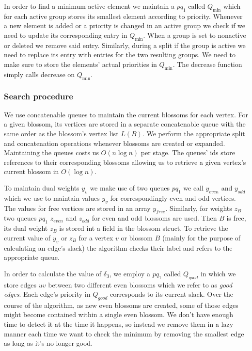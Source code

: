 In order to find a minimum active element we maintain a $pq_1$ called $Q_{\min}$ which for each active group stores its smallest element according to priority. Whenever a new element is added or a priority is changed in an active group we check if we need to update its corresponding entry in $Q_{\min}$. When a group is set to nonactive or deleted we remove said entry. Similarly, during a split if the group is active we need to replace its entry with entries for the two resulting groups. We need to make sure to store the elements' actual priorities in $Q_{\min}$. The decrease function simply calls decrease on $Q_{\min}$.

\subsubsection{Search procedure}

We use concatenable queues to maintain the current blossoms for each vertex. For a given blossom, its vertices are stored in a separate concatenable queue with the same order as the blossom's vertex list $L(B)$. We perform the appropriate split and concatenation operations whenever blossoms are created or expanded. Maintaining the queues costs us $O(n\log n)$ per stage. The queues' ids store references to their corresponding blossoms allowing us to retrieve a given vertex's current blossom in $O(\log n)$.

To maintain dual weights $y_v$ we make use of two queues $pq_1$ we call $y_{even}$ and $y_{odd}$ which we use to maintain values $y_v$ for correspondingly even and odd vertices. The values for free vertices are stored in an array $y_{free}$. Similarly, for weights $z_B$ two queues $pq_1$ $z_{even}$ and $z_{odd}$ for even and odd blossoms are used. Then $B$ is free, its dual weight $z_B$ is stored int a field in the blossom struct. To retrieve the current value of $y_v$ or $z_B$ for a vertex $v$ or blossom $B$ (mainly for the purpose of calculating an edge's slack) the algorithm checks their label and refers to the appropriate queue.

In order to calculate the value of $\delta_3$, we employ a $pq_1$ called $Q_{good}$ in which we store edges $uv$ between two different even blossoms which we refer to as \textit{good edges}. Each edge's priority in $Q_{good}$ corresponds to its current slack. Over the course of the algorithm, as new even blossoms are created, some of those edges might become contained within a single even blossom. We don't have enough time to detect it at the time it happens, so instead we remove them in a lazy manner each time we want to check the minimum by removing the smallest edge as long as it's no longer good.

